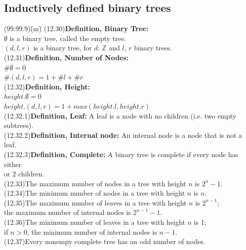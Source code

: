 \documentclass{amsart}
\newcommand{\lgap}{2pt}                             %
\begin{document}
\newpage

\subsection*{Inductively defined binary trees}
\begin{tabbing}
(99.99.9)\;\=(m)\;\=\kill
(12.30)\>\textbf{Definition, Binary Tree:}\\[\lgap]
           \>$\emptyset$ is a binary tree, called the empty tree.\\[\lgap]
           \>$(d, l, r)$ is a binary tree, for $d$: $\mathbb{Z}$ and $l$, $r$ binary trees.\\[\lgap]
(12.31)\>\textbf{Definition, Number of Nodes:}\\[\lgap]
           \>$\# \emptyset = 0$\\[\lgap]
           \>$\# (d, l, r) = 1+\# l + \#r$\\[\lgap]
(12.32)\>\textbf{Definition, Height:}\\[\lgap]
           \>$height.\emptyset = 0$\\[\lgap]
           \>$height.(d, l, r) = 1+max(height.l, height.r)$\\[\lgap]
(12.32.1)\>\textbf{Definition, Leaf: }A leaf is a node with no children (i.e. two empty subtrees).\\[\lgap]
(12.32.2)\>\textbf{Definition, Internal node: }An internal node is a node that is not a leaf.\\[\lgap]
(12.32.3)\>\textbf{Definition, Complete: }A binary tree is complete if every node has either\\[\lgap]
          or 2 children.\\[\lgap]
(12.33)\>The maximum number of nodes in a tree with height $n$ is $2^{n}-1$.\\[\lgap]
(12.34)\>The minimum number of nodes in a tree with height $n$ is $n$.\\[\lgap]
(12.35)\>The maximum number of leaves in a tree with height $n$ is $2^{n-1}$;\\[\lgap]
           \>the maximum number of internal nodes is $2^{n-1}-1$.\\[\lgap]
(12.36)\>The minimum number of leaves in a tree with height $n$ is 1;\\[\lgap]
           \>if $n>0$, the minimum number of internal nodes is $n-1$.\\[\lgap]
(12.37)\>Every nonempy complete tree has an odd number of nodes.\\[\lgap]
\end{tabbing}
\end{document}

